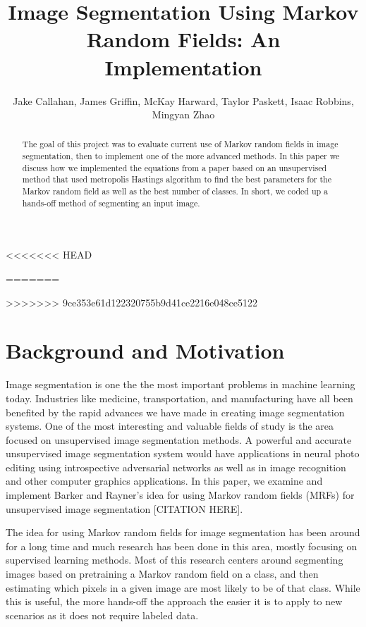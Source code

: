 \documentclass[11pt]{article}
\title{Image Segmentation Using Markov Random Fields: An Implementation}
\author{Jake Callahan, James Griffin, McKay Harward, Taylor Paskett, Isaac Robbins, Mingyan Zhao}
\begin{document}
<<<<<<< HEAD

\maketitle

=======
\maketitle
>>>>>>> 9ce353e61d122320755b9d41ce2216e048ce5122
\begin{abstract}
The goal of this project was to evaluate current use of Markov random fields in image segmentation, then to implement one of the more advanced methods. In this paper we discuss how we implemented the equations from a paper based on an unsupervised method that used metropolis Hastings algorithm to find the best parameters for the Markov random field as well as the best number of classes. In short, we coded up a hands-off method of segmenting an input image.
\end{abstract}

\section{Background and Motivation}
Image segmentation is one the the most important problems in machine learning today. Industries like medicine, transportation, and manufacturing have all been benefited by the rapid advances we have made in creating image segmentation systems.
One of the most interesting and valuable fields of study is the area focused on unsupervised image segmentation methods.
A powerful and accurate unsupervised image segmentation system would have applications in neural photo editing using introspective adversarial networks as well as in image recognition and other computer graphics applications. In this paper, we examine and implement Barker and Rayner's idea for using Markov random fields (MRFs) for unsupervised image segmentation [CITATION HERE].

 The idea for using Markov random fields for image segmentation has been around for a long time and much research has been done in this area, mostly focusing on supervised learning methods.
 Most of this research centers around segmenting images based on pretraining a Markov random field on a class, and then estimating which pixels in a given image are most likely to be of that class. While this is useful, the more hands-off the approach the easier it is to apply to new scenarios as it does not require labeled data.
\end{document}
